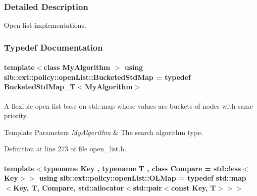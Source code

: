 \subsubsection{Detailed Description}
Open list implementations. 

\subsubsection{Typedef Documentation}
\paragraph[{\texorpdfstring{Bucketed\+Std\+Map}{BucketedStdMap}}]{\setlength{\rightskip}{0pt plus 5cm}template$<$class My\+Algorithm $>$ using {\bf slb\+::ext\+::policy\+::open\+List\+::\+Bucketed\+Std\+Map} = typedef {\bf Bucketed\+Std\+Map\+\_\+T}$<$My\+Algorithm$>$}\hypertarget{namespaceslb_1_1ext_1_1policy_1_1openList_af51e9574befd1fada8e2695f7acb83b8}{}\label{namespaceslb_1_1ext_1_1policy_1_1openList_af51e9574befd1fada8e2695f7acb83b8}


A flexible open list base on {\ttfamily std\+::map} whose values are buckets of nodes with same priority. 


\begin{DoxyTemplParams}{Template Parameters}
{\em My\+Algorithm} & The search algorithm type. \\
\hline
\end{DoxyTemplParams}


Definition at line 273 of file open\+\_\+list.\+h.

\paragraph[{\texorpdfstring{O\+L\+Map}{OLMap}}]{\setlength{\rightskip}{0pt plus 5cm}template$<$typename Key , typename T , class Compare  = std\+::less$<$\+Key$>$$>$ using {\bf slb\+::ext\+::policy\+::open\+List\+::\+O\+L\+Map} = typedef std\+::map$<$Key, T, Compare, std\+::allocator$<$std\+::pair$<$const Key, T$>$$>$$>$}\hypertarget{namespaceslb_1_1ext_1_1policy_1_1openList_ae328455bada2886ad728a9f54bfa1f6a}{}\label{namespaceslb_1_1ext_1_1policy_1_1openList_ae328455bada2886ad728a9f54bfa1f6a}


